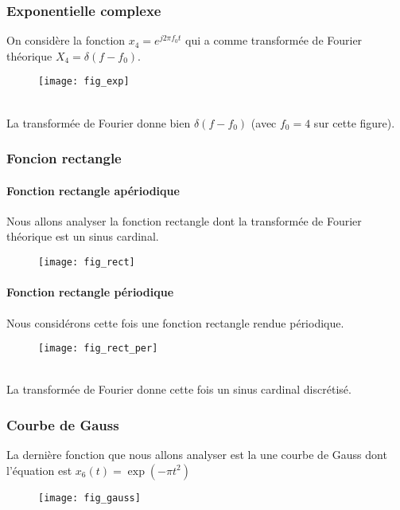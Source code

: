 \documentclass{article}
\begin{document}
\subsubsection{Exponentielle complexe}
On considère la fonction $x_4=e^{j2\pi f_0 t}$ qui a comme transformée de Fourier théorique $X_4=\delta(f-f_0)$.
\begin{figure}[h]
\texttt{[image: fig\_exp]}
\centering
\end{figure} \\
La transformée de Fourier donne bien $\delta(f-f_0)$ (avec $f_0=4$ sur cette figure).

\subsubsection{Foncion rectangle}
\paragraph{Fonction rectangle apériodique}
Nous allons analyser la fonction rectangle dont la transformée de Fourier théorique est un sinus cardinal.
\begin{figure}[h]
\texttt{[image: fig\_rect]}
\centering
\end{figure}
\paragraph{Fonction rectangle périodique}
Nous considérons cette fois une fonction rectangle rendue périodique.
\begin{figure}[h]
\texttt{[image: fig\_rect\_per]}
\centering
\end{figure} \\
La transformée de Fourier donne cette fois un sinus cardinal discrétisé.
\subsubsection{Courbe de Gauss}
La dernière fonction que nous allons analyser est la une courbe de Gauss dont l'équation est $x_6(t)=\exp(-\pi t^2)$
\begin{figure}[h]
\texttt{[image: fig\_gauss]}
\centering
\end{figure}
\end{document}
